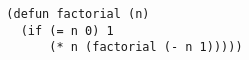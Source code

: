 \begin{verbatim}
  (defun factorial (n)
    (if (= n 0) 1
        (* n (factorial (- n 1)))))
\end{verbatim}
